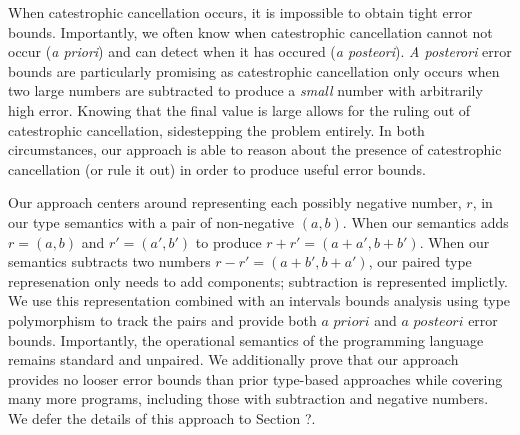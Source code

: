When catestrophic cancellation occurs, it is impossible to obtain tight error
bounds. Importantly, we often know when catestrophic cancellation cannot not
occur (\textit{a priori}) and can detect when it has occured (\textit{a
posteori}). \textit{A posterori} error bounds are particularly promising as
catestrophic cancellation only occurs when two large numbers are subtracted to
produce a \textit{small} number with arbitrarily high error. Knowing that the
final value is large allows for the ruling out of catestrophic cancellation,
sidestepping the problem entirely.
In both circumstances, our approach is able to reason about the presence of
catestrophic cancellation (or rule it out) in order to produce useful error
bounds.

Our approach centers around representing each possibly negative number, $r$, in
our type semantics with a pair of non-negative $(a, b)$. When our semantics adds
$r = (a, b)$ and $r' = (a', b')$ to produce $r + r' = (a + a', b + b')$. When
our semantics subtracts two numbers $r - r' = (a + b', b + a')$, our paired type
represenation only needs to add components; subtraction is represented
implictly. We use this representation combined with an intervals bounds analysis
using type polymorphism to track the pairs and provide both $\textit{a priori}$
and $\textit{a posteori}$ error bounds. Importantly, the operational semantics
of the programming language remains standard and unpaired. We additionally prove
that our approach provides no looser error bounds than prior type-based
approaches while covering many more programs, including those with subtraction
and negative numbers.
We defer the details of this approach to Section ?. 

